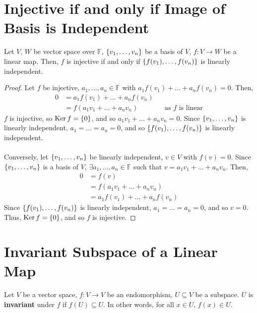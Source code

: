 \documentclass[letterpaper,12pt]{article}
\begin{document}
\section*{Injective if and only if Image of Basis is Independent}
\begin{theorem}
Let $V$, $W$ be vector space over $\mathbb{F}$, $\left\{ v_1, \dots, v_n \right\}$ be a basis of $V$, $f: V \rightarrow W$ be a linear map. Then, $f$ is injective if and only if $\left\{ f(v_1), \dots, f(v_n) \right\}$ is linearly independent.
\end{theorem}
\begin{proof}
Let $f$ be injective, $a_1, \dots, a_n \in \mathbb{F}$ with $a_1 f(v_1) + \dots + a_n f(v_n) = 0$. Then,
\begin{align*}
    0 & = a_1 f(v_1) + \dots + a_n f(v_n) \\
    & = f(a_1 v_1 + \dots + a_n v_n) && \text{as $f$ is linear}
\end{align*}
$f$ is injective, so $\operatorname{Ker}{f} = \left\{ 0 \right\}$, and so $a_1 v_1 + \dots + a_n v_n = 0$. Since $\left\{ v_1, \dots, v_n \right\}$ is linearly independent, $a_1 = \dots = a_n = 0$, and so $\left\{ f(v_1), \dots, f(v_n) \right\}$ is linearly independent.
\\ \\ Conversely, let $\left\{ v_1, \dots, v_n \right\}$ be linearly independent, $v \in V$ with $f(v) = 0$. Since $\left\{ v_1, \dots, v_n \right\}$ is a basis of $V$, $\exists a_1, \dots, a_n \in \mathbb{F}$ such that $v = a_1 v_1 + \dots + a_n v_n$. Then,
\begin{align*}
    0 & = f(v) \\
    & = f(a_1 v_1 + \dots + a_n v_n) \\
    & = a_1 f(v_1) + \dots + a_n f(v_n)
\end{align*}
Since $\left\{ f(v_1), \dots, f(v_n) \right\}$ is linearly independent, $a_1 = \dots = a_n = 0$, and so $v = 0$. Thus, $\operatorname{Ker}{f} = \left\{ 0 \right\}$, and so $f$ is injective.

\end{proof}

\section*{Invariant Subspace of a Linear Map}
\begin{definition}
Let $V$ be a vector space, $f: V \rightarrow V$ be an endomorphism, $U \subseteq V$ be a subspace. $U$ is \textbf{invariant} under $f$ if $f(U) \subseteq U$. In other words, for all $x \in U$, $f(x) \in U$.
\end{definition}
\end{document}
